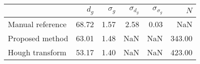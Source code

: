 \begin{tabular}{lrrrrr}
\toprule
{} &  $d_g$ &  $\sigma_g$ &  $\sigma_{d_g}$ &  $\sigma_{\sigma_g}$ &    $N$ \\
\midrule
Manual reference &  68.72 &        1.57 &            2.58 &                 0.03 &    NaN \\
Proposed method  &  63.01 &        1.48 &             NaN &                  NaN & 343.00 \\
Hough transform  &  53.17 &        1.40 &             NaN &                  NaN & 423.00 \\
\bottomrule
\end{tabular}
